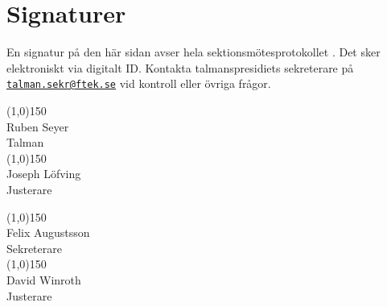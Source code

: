 \documentclass[hidelinks]{../sektionsmote} %
\begin{document}
\clearpage
\section*{Signaturer}
En signatur på den här sidan avser hela sektionsmötesprotokollet \themote. Det sker elektroniskt via digitalt ID. Kontakta talmanspresidiets sekreterare på \href{mailto:talman.sekr@ftek.se}{\texttt{talman.sekr@ftek.se}} vid kontroll eller övriga frågor. 

\vspace{4cm}

\begin{minipage}{0.45\textwidth}
    \begin{center}
        \line(1,0){150}\\
        \footnotesize Ruben Seyer\\ %
        Talman\\[3cm]
        \line(1,0){150}\\
        \footnotesize Joseph Löfving\\ %
        Justerare
        \end{center}
        \end{minipage}
        \begin{minipage}{0.45\textwidth}
        \begin{center}
        \line(1,0){150}\\
        \footnotesize Felix Augustsson\\ %
        Sekreterare\\[3cm]
        \line(1,0){150}\\
        \footnotesize David Winroth\\ %
        Justerare
    \end{center}
\end{minipage}
\end{document}

